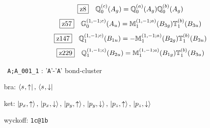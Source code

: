 \documentclass[fleqn,10pt,landscape]{jsarticle}
\begin{document}
\begin{dmath*}
\hspace*{3mm}\fbox{z8}\quad \mathbb{Q}_{0}^{(c)}(A_{g})=\mathbb{Q}_{0}^{(a)}(A_{g}) \mathbb{Q}_{0}^{(b)}(A_{g})
\end{dmath*}
\begin{dmath*}
\hspace*{3mm}\fbox{z57}\quad \mathbb{G}_{0}^{(1,-1;c)}(A_{u})=\mathbb{M}_{1}^{(1,-1;a)}(B_{3g}) \mathbb{T}_{1}^{(b)}(B_{3u})
\end{dmath*}
\begin{dmath*}
\hspace*{3mm}\fbox{z147}\quad \mathbb{Q}_{1}^{(1,-1;c)}(B_{1u})=- \mathbb{M}_{1}^{(1,-1;a)}(B_{2g}) \mathbb{T}_{1}^{(b)}(B_{3u})
\end{dmath*}
\begin{dmath*}
\hspace*{3mm}\fbox{z229}\quad \mathbb{Q}_{1}^{(1,-1;c)}(B_{2u})=\mathbb{M}_{1}^{(1,-1;a)}(B_{1g}) \mathbb{T}_{1}^{(b)}(B_{3u})
\end{dmath*}
\vspace{5mm}

\noindent\textbullet\, \texttt{A;A_001_1} : '\texttt{A}'-'\texttt{A}' bond-cluster

\noindent\quad * bra: $\bra{s_{},\uparrow},\, \bra{s_{},\downarrow}$

\noindent\quad * ket: $\ket{p_{x},\uparrow},\, \ket{p_{x},\downarrow},\, \ket{p_{y},\uparrow},\, \ket{p_{y},\downarrow},\, \ket{p_{z},\uparrow},\, \ket{p_{z},\downarrow}$

\noindent\quad * wyckoff: \texttt{1c@1b}
\end{document}
